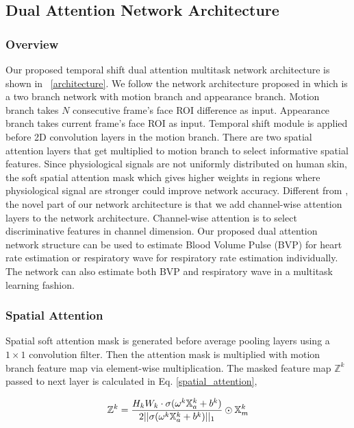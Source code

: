 \documentclass[conference]{IEEEtran}
\begin{document}
\subsection{Dual Attention Network Architecture}
\subsubsection{Overview} 

Our proposed temporal shift dual attention multitask network architecture is shown in \figurename~\ref{architecture}. We follow the network architecture proposed in \cite{chen2018deepphys,liu2020multi} which is a two branch network with motion branch and appearance branch. Motion branch takes $N$ consecutive frame's face ROI difference as input. Appearance branch takes current frame's face ROI as input. Temporal shift module \cite{lin2019tsm} is applied before 2D convolution layers in the motion branch. There are two spatial attention layers that get multiplied to motion branch to select informative spatial features. Since physiological signals are not uniformly distributed on human skin, the soft spatial attention mask which gives higher weights in regions where physiological signal are stronger could improve network accuracy. Different from \cite{chen2018deepphys,liu2020multi}, the novel part of our network architecture is that we add channel-wise attention layers to the network architecture. Channel-wise attention is to select discriminative features in channel dimension. Our proposed dual attention network structure can be used to estimate Blood Volume Pulse (BVP) for heart rate estimation or respiratory wave for respiratory rate estimation individually. The network can also estimate both BVP and respiratory wave in a multitask learning fashion.

\subsubsection{Spatial Attention} 
Spatial soft attention mask is generated before average pooling layers using a $1\times1$ convolution filter. Then the attention mask is multiplied with motion branch feature map via element-wise multiplication. The masked feature map $\mathbb{Z}^{k}$ passed to next layer is calculated in Eq. \ref{spatial_attention},

\begin{dmath}
 \mathbb{Z}^{k} = \frac{H_{k}W_{k}\cdot \sigma(\omega^{k} \mathbb{X}_{a}^{k} + b^{k})}{2||\sigma(\omega^{k} \mathbb{X}_{a}^{k} + b^{k})||_{1}} \odot \mathbb{X}_{m}^{k}\\
\label{spatial_attention}
\end{dmath}
\end{document}
